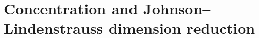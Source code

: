 \chapter{Concentration and Johnson--Lindenstrauss dimension reduction}
\label{chapter:dimension-reduction}






